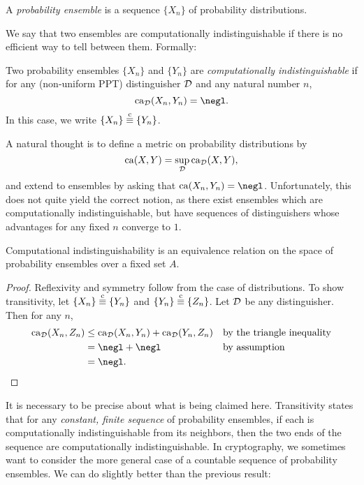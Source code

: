 \begin{dfn}\label{def:probability ensemble}
  A \emph{probability ensemble} is a sequence $\{X_n\}$ of probability
  distributions.
\end{dfn}

We say that two ensembles are computationally indistinguishable if there is no
efficient way to tell between them. Formally:

\begin{dfn}\label{def:computational indistinguishability}
  Two probability ensembles $\{X_n\}$ and $\{Y_n\}$ are \emph{computationally
  indistinguishable} if for any (non-uniform PPT) distinguisher $\mathcal{D}$ and any
  natural number $n$,
  \[
    \ca_\cD(X_n, Y_n) = \negl.
  \]
  In this case, we write $\{X_n\}\overset{\text{c}}{\equiv}\{Y_n\}$.
\end{dfn}

\begin{rmk}
  A natural thought is to define a metric on probability distributions by
  \[
    \operatorname{ca}(X, Y) = \sup_{\mathcal{D}}\operatorname{ca}_{\mathcal{D}}(X, Y),
  \] and extend to ensembles by asking
  that $\ca(X_n, Y_n) = \negl$. Unfortunately, this does not quite yield the
  correct notion, as there exist ensembles which are computationally
  indistinguishable, but have sequences of distinguishers whose advantages for
  any fixed $n$ converge to $1$.
\end{rmk}

\begin{prop}
  Computational indistinguishability is an equivalence relation on the space of
  probability ensembles over a fixed set $A$.
\end{prop}

\begin{proof}
  Reflexivity and symmetry follow from the case of distributions. To show
  transitivity, let $\{X_n\} \overset{\text{c}}{\equiv} \{Y_n\}$ and $\{Y_n\} \overset{\text{c}}{\equiv} \{Z_n\}$. Let
  $\mathcal{D}$ be any distinguisher. Then for any $n$, \begin{align*}
    \ca_\cD(X_n, Z_n) &\leq \ca_\cD(X_n, Y_n) + \ca_\cD(Y_n, Z_n) &&\text{by the triangle inequality} \\
                        &= \negl + \negl &&\text{by assumption} \\
                        &= \negl. &&\qedhere
  \end{align*}
\end{proof}

It is necessary to be precise about what is being claimed here. Transitivity
states that for any \emph{constant, finite sequence} of probability ensembles,
if each is computationally indistinguishable from its neighbors, then the two
ends of the sequence are computationally indistinguishable. In cryptography, we
sometimes want to consider the more general case of a countable sequence of
probability ensembles. We can do slightly better than the previous result:

